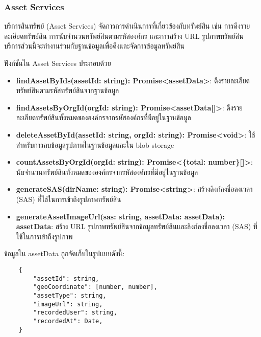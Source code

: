 \subsubsection{Asset Services}
\ifenglish
\else
บริการสินทรัพย์ (Asset Services) จัดการการดำเนินการที่เกี่ยวข้องกับทรัพย์สิน เช่น การดึงรายละเอียดทรัพย์สิน การนับจำนวนทรัพย์สินตามรหัสองค์กร และการสร้าง URL รูปภาพทรัพย์สิน บริการส่วนนี้จะทำงานร่วมกับฐานข้อมูลเพื่อดึงและจัดการข้อมูลทรัพย์สิน

ฟังก์ชันใน Asset Services ประกอบด้วย

\begin{itemize}
    \item \textbf{findAssetByIds(assetId: string): Promise<assetData>}: ดึงรายละเอียดทรัพย์สินตามรหัสทรัพย์สินจากฐานข้อมูล
    \item \textbf{findAssetsByOrgId(orgId: string): Promise<assetData[]>}: ดึงรายละเอียดทรัพย์สินทั้งหมดขององค์กรจากรหัสองค์กรที่มีอยู่ในฐานข้อมูล
    \item \textbf{deleteAssetById(assetId: string, orgId: string): Promise<void>}: ใช้สำหรับการลบข้อมูลรูปภาพในฐานข้อมูลและใน blob storage
    \item \textbf{countAssetsByOrgId(orgId: string): Promise<\{total: number\}[]>}: นับจำนวนทรัพย์สินทั้งหมดขององค์กรจากรหัสองค์กรที่มีอยู่ในฐานข้อมูล
    \item \textbf{generateSAS(dirName: string): Promise<string>}: สร้างลิงก์ลงชื่อลงเวลา (SAS) ที่ใช้ในการเข้าถึงรูปภาพทรัพย์สิน
    \item \textbf{generateAssetImageUrl(sas: string,
    assetData: assetData): assetData}: สร้าง URL รูปภาพทรัพย์สินจากข้อมูลทรัพย์สินและลิงก์ลงชื่อลงเวลา (SAS) ที่ใช้ในการเข้าถึงรูปภาพ
\end{itemize}

ข้อมูลใน assetData ถูกจัดเก็บในรูปแบบดังนี้:
\begin{lstlisting}
    {
        "assetId": string,
        "geoCoordinate": [number, number],
        "assetType": string,
        "imageUrl": string,
        "recordedUser": string,
        "recordedAt": Date,
    }
\end{lstlisting}
\fi